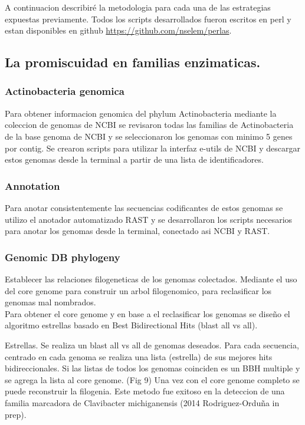 \documentclass[12pt,twoside]{reedthesis}
\begin{document}
  A continuacion describiré la metodologia para cada una de las
  estrategias expuestas previamente. Todos los scripts desarrollados
  fueron escritos en perl y estan disponibles en github
  \url{https://github.com/nselem/perlas}.
  
  \subsection{La promiscuidad en familias
  enzimaticas.}\label{la-promiscuidad-en-familias-enzimaticas.-1}
  
  \subsubsection{Actinobacteria genomica}\label{actinobacteria-genomica}
  
  Para obtener informacion genomica del phylum Actinobacteria mediante la
  coleccion de genomas de NCBI se revisaron todas las familias de
  Actinobacteria de la base genoma de NCBI y se seleccionaron los genomas
  con minimo 5 genes por contig. Se crearon scripts para utilizar la
  interfaz e-utils de NCBI y descargar estos genomas desde la terminal a
  partir de una lista de identificadores.
  
  \subsubsection{Annotation}\label{annotation}
  
  Para anotar consistentemente las secuencias codificantes de estos
  genomas se utilizo el anotador automatizado RAST y se desarrollaron los
  scripts necesarios para anotar los genomas desde la terminal, conectado
  asi NCBI y RAST.
  
  \subsubsection{Genomic DB phylogeny}\label{genomic-db-phylogeny}
  
  Establecer las relaciones filogeneticas de los genomas colectados.
  Mediante el uso del core genome para construir un arbol filogenomico,
  para reclasificar los genomas mal nombrados.\\
  Para obtener el core genome y en base a el reclasificar los genomas se
  diseño el algoritmo estrellas basado en Best Bidirectional Hits (blast
  all vs all).
  
  Estrellas. Se realiza un blast all vs all de genomas deseados. Para cada
  secuencia, centrado en cada genoma se realiza una lista (estrella) de
  sus mejores hits bidireccionales. Si las listas de todos los genomas
  coinciden es un BBH multiple y se agrega la lista al core genome. (Fig
  9) Una vez con el core genome completo se puede reconstruir la
  filogenia. Este metodo fue exitoso en la deteccion de una familia
  marcadora de Clavibacter michiganensis (2014 Rodriguez-Orduña in prep).
  
\end{document}
